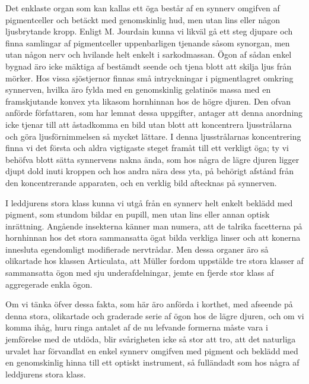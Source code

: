 Det enklaste organ som kan kallas ett öga består af en synnerv omgifven af pigmentceller och betäckt med genomskinlig hud, men utan lins eller någon ljusbrytande kropp. Enligt M. Jourdain kunna vi likväl gå ett steg djupare och finna samlingar af pigmentceller uppenbarligen tjenande såsom synorgan, men utan någon nerv och hvilande helt enkelt i sarkodmassan. Ögon af sådan enkel bygnad äro icke mäktiga af bestämdt seende och tjena blott att skilja ljus från mörker. Hos vissa sjöstjernor finnas små intryckningar i pigmentlagret omkring synnerven, hvilka äro fylda med en genomskinlig gelatinös massa med en framskjutande konvex yta likasom hornhinnan hos de högre djuren. Den ofvan anförde författaren, som har lemnat dessa uppgifter, antager att denna anordning icke tjenar till att åstadkomma en bild utan blott att koncentrera ljusstrålarna och göra ljusförnimmelsen så mycket lättare. I denna ljusstrålarnas koncentrering finna vi det första och aldra vigtigaste steget framåt till ett verkligt öga; ty vi behöfva blott sätta synnervens nakna ända, som hos några de lägre djuren ligger djupt dold inuti kroppen och hos andra nära dess yta, på behörigt afstånd från den koncentrerande apparaten, och en verklig bild aftecknas på synnerven.

I leddjurens stora klass kunna vi utgå från en synnerv helt enkelt beklädd med pigment, som stundom bildar en pupill, men utan lins eller annan optisk inrättning. Angående insekterna känner man numera, att de talrika facetterna på hornhinnan hos det stora sammansatta ögat bilda verkliga linser och att konerna innesluta egendomligt modifierade nervtrådar. Men dessa organer äro så olikartade hos klassen Articulata, att Müller fordom uppstälde tre stora klasser af sammansatta ögon med sju underafdelningar, jemte en fjerde stor klass af aggregerade enkla ögon.

Om vi tänka öfver dessa fakta, som här äro anförda i korthet, med afseende på denna stora, olikartade och graderade serie af ögon hos de lägre djuren, och om vi komma ihåg, huru ringa antalet af de nu lefvande formerna måste vara i jemförelse med de utdöda, blir svårigheten icke så stor att tro, att det naturliga urvalet har förvandlat en enkel synnerv omgifven med pigment och beklädd med en genomskinlig hinna till ett optiskt instrument, så fulländadt som hos några af leddjurens stora klass.

